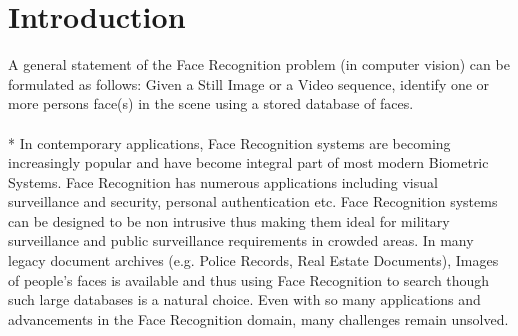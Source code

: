 \section{Introduction}

A general statement of the Face Recognition problem (in computer vision) can be formulated as follows: Given a Still Image or a Video sequence, identify one or more persons face(s) in the scene using a stored database of faces.\\ 
\\*
In contemporary applications, Face Recognition systems are becoming increasingly popular and have become integral part of most modern Biometric Systems.  Face Recognition has   numerous applications   including   visual   surveillance   and   security, personal authentication etc. Face Recognition systems can be designed to be non intrusive thus making them ideal for military surveillance and public surveillance requirements in crowded areas. In many legacy document archives (e.g. Police Records, Real Estate Documents), Images of people's faces is available and thus using Face Recognition to search though such large databases is a natural choice. Even with so many applications and advancements in the Face Recognition domain, many challenges remain unsolved.
